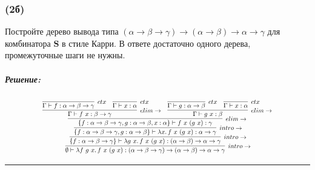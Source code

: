 \documentclass{article}
\newenvironment{proof}{\subparagraph{\hspace{-1em}Решение:\newline}\-}{\par\noindent\rule{\textwidth}{0.4pt}}
\newcommand{\term}[1]{\mathbf{#1}}
\newcommand{\ap}{~}
\begin{document}
    \subsubsection{(2б)}

    Постройте дерево вывода типа $(\alpha \to \beta \to \gamma) \to (\alpha \to \beta) \to \alpha \to \gamma$ для комбинатора $\term{S}$ в стиле Карри.
    В ответе достаточно одного дерева, промежуточные шаги не нужны.

    \begin{proof}
      \[\resizebox{0.8\hsize}{!}{
          \infer[intro\to]
          {\emptyset \vdash \lambda f~g~x\ldotp f \ap x \ap (g \ap x) : (\alpha \to \beta \to \gamma) \to (\alpha \to \beta) \to \alpha \to \gamma}
          {
              \infer[intro\to]{
                  \{f : \alpha \to \beta \to \gamma\} \vdash \lambda g~x\ldotp f \ap x \ap (g \ap x) : (\alpha \to \beta) \to \alpha \to \gamma        
              }{
                \infer[intro\to]{
                    \{f : \alpha \to \beta \to \gamma, g : \alpha \to \beta\} \vdash \lambda x\ldotp f \ap x \ap (g \ap x) : \alpha \to \gamma        
                }{
                  \infer[elim\to]{
                      \{f : \alpha \to \beta \to \gamma, g : \alpha \to \beta , x : \alpha\} \vdash f \ap x \ap (g \ap x) : \gamma
                  }{
                    \infer[elim\to]{
                        \Gamma \vdash f \ap x : \beta \to \gamma
                    }{
                        \infer[ctx]{
                            \Gamma \vdash f : \alpha \to \beta \to \gamma
                        }{} &
                        \infer[ctx]{
                            \Gamma \vdash x : \alpha
                        }{}
                    } &
                    \infer[elim\to]{
                        \Gamma \vdash g \ap x : \beta
                    }{
                        \infer[ctx]{
                            \Gamma \vdash g : \alpha \to \beta
                        }{} &
                        \infer[ctx]{
                            \Gamma \vdash x : \alpha
                        }{}
                    }
                  }
                }
              }
          }
      }\]
    \end{proof}
\end{document}
